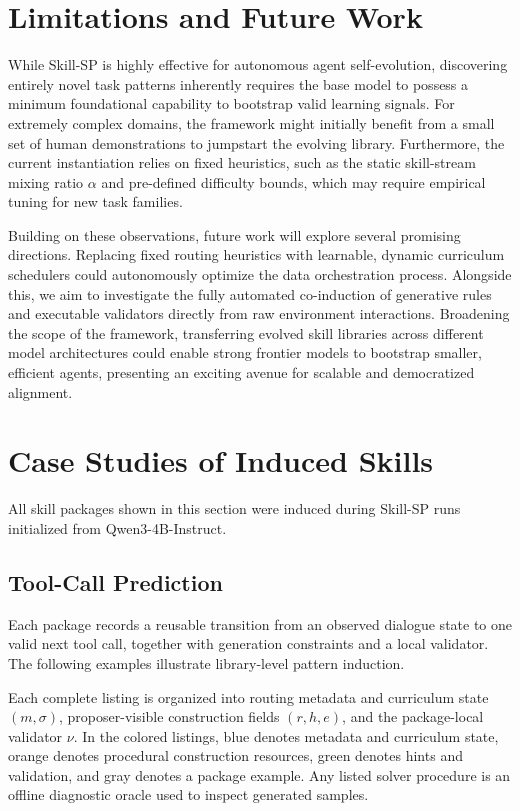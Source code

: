 \section{Limitations and Future Work}
\label{app:limitations}

While Skill-SP is highly effective for autonomous agent self-evolution, discovering entirely novel task patterns inherently requires the base model to possess a minimum foundational capability to bootstrap valid learning signals. For extremely complex domains, the framework might initially benefit from a small set of human demonstrations to jumpstart the evolving library. Furthermore, the current instantiation relies on fixed heuristics, such as the static skill-stream mixing ratio $\alpha$ and pre-defined difficulty bounds, which may require empirical tuning for new task families.

Building on these observations, future work will explore several promising directions. Replacing fixed routing heuristics with learnable, dynamic curriculum schedulers could autonomously optimize the data orchestration process. Alongside this, we aim to investigate the fully automated co-induction of generative rules and executable validators directly from raw environment interactions. Broadening the scope of the framework, transferring evolved skill libraries across different model architectures could enable strong frontier models to bootstrap smaller, efficient agents, presenting an exciting avenue for scalable and democratized alignment.



\section{Case Studies of Induced Skills}
\label{app:skill_case_studies}

All skill packages shown in this section were induced during Skill-SP runs initialized from Qwen3-4B-Instruct.

\subsection{Tool-Call Prediction}
\label{app:toolcall_skill_cases}

Each package records a reusable transition from an observed dialogue state to one valid next tool call, together with generation constraints and a local validator. The following examples illustrate library-level pattern induction.

Each complete listing is organized into routing metadata and curriculum state $(m,\sigma)$, proposer-visible construction fields $(r,h,e)$, and the package-local validator $\nu$. In the colored listings, blue denotes metadata and curriculum state, orange denotes procedural construction resources, green denotes hints and validation, and gray denotes a package example. Any listed solver procedure is an offline diagnostic oracle used to inspect generated samples.

